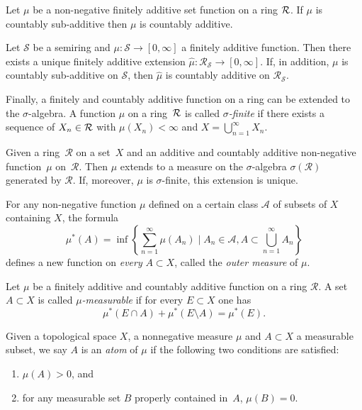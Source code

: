 \begin{proposition}
Let $\mu$ be a non-negative finitely additive set function on a ring $\mathcal{R}$.
If $\mu$ is countably sub-additive then $\mu$ is countably additive.
\label{prop:subadd_to_add}
\end{proposition}

\begin{proposition}
\label{prop:addsemitoring}
Let $\mathcal S$ be a semiring and $\mu:\mathcal S\to [0,\infty]$ a finitely additive function. Then there exists a unique finitely additive extension
 $\hat\mu:\mathcal R_{\mathcal S} \to [0,\infty]$. If, in addition, $\mu$ is countably sub-additive on $\mathcal S$, then $\hat\mu$ is countably additive on $\mathcal R_{\mathcal S}$.
\end{proposition}

Finally, a finitely and countably additive function on a ring can be extended to the $\sigma$-algebra. A function $\mu$ on a ring~$\mathcal{R}$ is called \emph{$\sigma$-finite} if
there exists a sequence of $X_n \in \mathcal{R}$ with $\mu(X_n)<\infty$ and
$X=\bigcup_{n=1}^{\infty} X_n$.

\begin{theorem}
\label{thm:caratheodory}
Given a ring~$\mathcal{R}$ on a set~$X$ and an additive and countably additive non-negative function~$\mu$ on~$\mathcal{R}$.
Then $\mu$ extends to a measure on the $\sigma$-algebra
$\sigma(\mathcal{R})$ generated by $\mathcal{R}$. If, moreover, $\mu$
is $\sigma$-finite, this extension is unique.
\end{theorem}

For any non-negative function $\mu$ defined on a certain class $\mathcal{A}$ of subsets of $X$ containing $X$, the formula
\[
\mu^*(A) = \inf \left\{ \sum_{n=1}^\infty \mu(A_n) \mid A_n \in \mathcal{A}, A \subset \bigcup_{n=1}^{\infty} A_n \right\}
\]
defines a new function on \emph{every} $A \subset X$, called the \emph{outer measure} of $\mu$.

Let $\mu$ be a finitely additive and countably additive function on a
ring $\mathcal{R}$. A set $A \subset X$ is called
\emph{$\mu$-measurable} if for every $E \subset X$ one has
\[
\mu^*(E \cap A) + \mu^*(E \setminus A) = \mu^*(E).
\]

\begin{definition}
\label{def:atommeasure}
Given a topological space $X$, a nonnegative measure $\mu$ and $A\subset X$ a measurable subset, we say $A$ is an \emph{atom} of $\mu$ if the following two conditions are satisfied:
\begin{enumerate}
    \item $\mu(A) > 0$, and
    \item for any measurable set $B$ properly contained in~$A$, $\mu(B)=0$.
\end{enumerate}
\end{definition}


